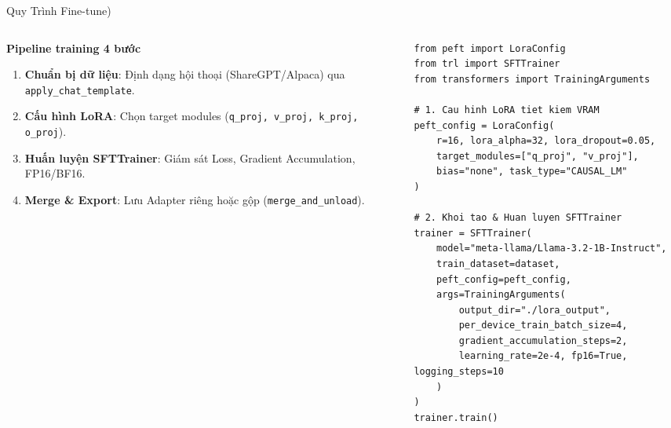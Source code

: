 \documentclass[aspectratio=169, 10pt]{beamer}
\begin{document}
\begin{frame}[fragile]{Quy Trình Fine-tune)}
\begin{columns}[T]
  \begin{column}{0.46\textwidth}
    \begin{block}{\textbf{Pipeline training 4 bước}}
      \small
      \begin{enumerate}\setlength{\itemsep}{2pt}
        \item \textbf{Chuẩn bị dữ liệu}: Định dạng hội thoại (ShareGPT/Alpaca) qua \texttt{apply\_chat\_template}.
        \item \textbf{Cấu hình LoRA}: Chọn target modules (\texttt{q\_proj, v\_proj, k\_proj, o\_proj}).
        \item \textbf{Huấn luyện SFTTrainer}: Giám sát Loss, Gradient Accumulation, FP16/BF16.
        \item \textbf{Merge \& Export}: Lưu Adapter riêng hoặc gộp (\texttt{merge\_and\_unload}).
      \end{enumerate}
    \end{block}
  \end{column}

  \begin{column}{0.52\textwidth}
\begin{lstlisting}[basicstyle=\ttfamily\fontsize{6.8pt}{8.2pt}\selectfont]
from peft import LoraConfig
from trl import SFTTrainer
from transformers import TrainingArguments

# 1. Cau hinh LoRA tiet kiem VRAM
peft_config = LoraConfig(
    r=16, lora_alpha=32, lora_dropout=0.05,
    target_modules=["q_proj", "v_proj"],
    bias="none", task_type="CAUSAL_LM"
)

# 2. Khoi tao & Huan luyen SFTTrainer
trainer = SFTTrainer(
    model="meta-llama/Llama-3.2-1B-Instruct",
    train_dataset=dataset,
    peft_config=peft_config,
    args=TrainingArguments(
        output_dir="./lora_output",
        per_device_train_batch_size=4,
        gradient_accumulation_steps=2,
        learning_rate=2e-4, fp16=True, logging_steps=10
    )
)
trainer.train()
\end{lstlisting}
  \end{column}
\end{columns}
\end{frame}
\end{document}
